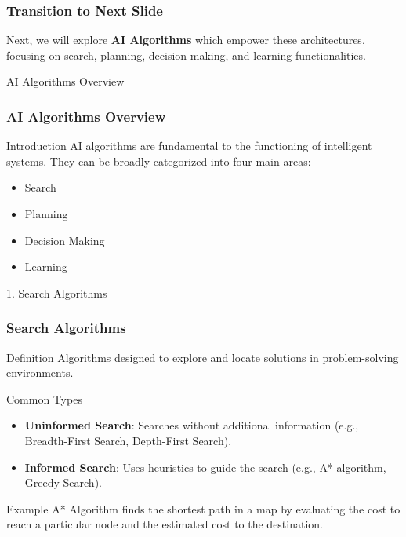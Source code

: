 \documentclass[aspectratio=169]{beamer}
\begin{document}
\begin{frame}[fragile]
    \frametitle{Transition to Next Slide}
    Next, we will explore \textbf{AI Algorithms} which empower these architectures, focusing on search, planning, decision-making, and learning functionalities.
\end{frame}

\begin{frame}[fragile]{AI Algorithms Overview}
    \frametitle{AI Algorithms Overview}
    
    \begin{block}{Introduction}
    AI algorithms are fundamental to the functioning of intelligent systems. They can be broadly categorized into four main areas:
    \begin{itemize}
        \item Search
        \item Planning
        \item Decision Making
        \item Learning
    \end{itemize}
    \end{block}
\end{frame}

\begin{frame}[fragile]{1. Search Algorithms}
    \frametitle{Search Algorithms}

    \begin{block}{Definition}
    Algorithms designed to explore and locate solutions in problem-solving environments.
    \end{block}
    
    \begin{block}{Common Types}
        \begin{itemize}
            \item \textbf{Uninformed Search}: Searches without additional information (e.g., Breadth-First Search, Depth-First Search).
            \item \textbf{Informed Search}: Uses heuristics to guide the search (e.g., A* algorithm, Greedy Search).
        \end{itemize}
    \end{block}
    
    \begin{block}{Example}
        A* Algorithm finds the shortest path in a map by evaluating the cost to reach a particular node and the estimated cost to the destination.
    \end{block}
\end{frame}
\end{document}
